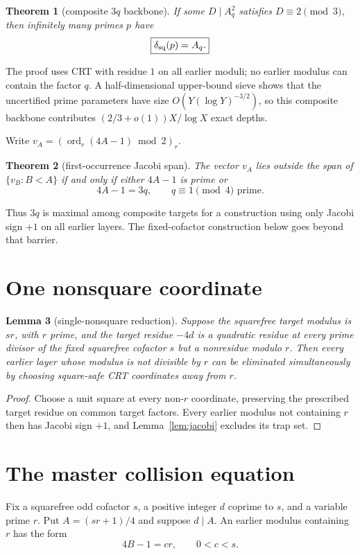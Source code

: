 \documentclass[11pt]{article}
\newtheorem{theorem}{Theorem}
\newtheorem{lemma}[theorem]{Lemma}
\theoremstyle{definition}
\newcommand{\sqdepth}{\delta_{\rm sq}}
\begin{document}
\begin{theorem}[composite $3q$ backbone]\label{thm:3q}
If some $D\mid A_q^2$ satisfies $D\equiv2\pmod3$, then infinitely many primes $p$ have
\[
\boxed{\sqdepth(p)=A_q.}
\]
\end{theorem}

The proof uses CRT with residue $1$ on all earlier moduli; no earlier modulus can contain the factor $q$. A half-dimensional upper-bound sieve shows that the uncertified prime parameters have size $O(Y(\log Y)^{-3/2})$, so this composite backbone contributes $(2/3+o(1))X/\log X$ exact depths.

Write $v_A=(\operatorname{ord}_r(4A-1)\bmod2)_r$.

\begin{theorem}[first-occurrence Jacobi span]\label{thm:span}
The vector $v_A$ lies outside the span of $\{v_B:B<A\}$ if and only if either $4A-1$ is prime or
\[
4A-1=3q,
\qquad q\equiv1\pmod4\text{ prime}.
\]
\end{theorem}

Thus $3q$ is maximal among composite targets for a construction using only Jacobi sign $+1$ on all earlier layers. The fixed-cofactor construction below goes beyond that barrier.

\section{One nonsquare coordinate}
\begin{lemma}[single-nonsquare reduction]\label{lem:single}
Suppose the squarefree target modulus is $sr$, with $r$ prime, and the target residue $-4d$ is a quadratic residue at every prime divisor of the fixed squarefree cofactor $s$ but a nonresidue modulo $r$. Then every earlier layer whose modulus is not divisible by $r$ can be eliminated simultaneously by choosing square-safe CRT coordinates away from $r$.
\end{lemma}

\begin{proof}
Choose a unit square at every non-$r$ coordinate, preserving the prescribed target residue on common target factors. Every earlier modulus not containing $r$ then has Jacobi sign $+1$, and Lemma~\ref{lem:jacobi} excludes its trap set.
\end{proof}

\section{The master collision equation}
Fix a squarefree odd cofactor $s$, a positive integer $d$ coprime to $s$, and a variable prime $r$. Put $A=(sr+1)/4$ and suppose $d\mid A$. An earlier modulus containing $r$ has the form
\[
4B-1=cr,
\qquad 0<c<s.
\]
\end{document}

